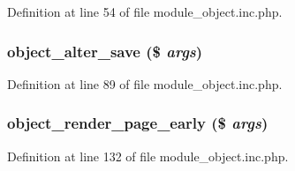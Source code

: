 Definition at line 54 of file module\_\-object.inc.php.

\hypertarget{module__object_8inc_8php_aba3a00b339dc7e9831b48a94f4f8e211}{
\subsubsection[{object\_\-alter\_\-save}]{\setlength{\rightskip}{0pt plus 5cm}object\_\-alter\_\-save (\$ {\em args})}}
\label{module__object_8inc_8php_aba3a00b339dc7e9831b48a94f4f8e211}


Definition at line 89 of file module\_\-object.inc.php.

\hypertarget{module__object_8inc_8php_ad06c13f1778d655f4a011d1763c6e618}{
\subsubsection[{object\_\-render\_\-page\_\-early}]{\setlength{\rightskip}{0pt plus 5cm}object\_\-render\_\-page\_\-early (\$ {\em args})}}
\label{module__object_8inc_8php_ad06c13f1778d655f4a011d1763c6e618}


Definition at line 132 of file module\_\-object.inc.php.

